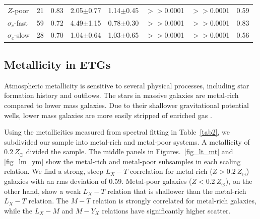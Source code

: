 \documentclass[iop]{emulateapj}
\begin{document}
\begin{table}
\begin{tabular}{llcccccc}
$Z$-poor & 21 & 0.83 & 2.05$\pm$0.77 & 1.14$\pm$0.45 & $>>$0.0001 & $>>$0.0001 & 0.59 \\
$\sigma_c$-fast & 59 & 0.72 & 4.49$\pm$1.15 & 0.78$\pm$0.30 & $>>$0.0001 & $>>$0.0001 & 0.83 \\
$\sigma_c$-slow & 28 & 0.70 & 1.04$\pm$0.64 & 1.03$\pm$0.65 & $>>$0.0001 & $>>$0.0001 & 0.56 \\
\hline
\end{tabular}
\end{table}

\subsection{Metallicity in ETGs}

Atmospheric metallicity is sensitive to several physical processes, including star formation history and outflows. The stars in massive galaxies are metal-rich compared to lower mass galaxies. Due to their shallower gravitational potential wells, lower mass galaxies are more easily stripped of enriched gas \citep{Faber:73, Babyk:13}. 

Using the metallicities measured from spectral fitting in Table~\ref{tab2}, we subdivided our sample into metal-rich and metal-poor systems. A metallicity of $0.2~Z_{\odot}$ divided the sample. The middle panels in Figures.~\ref{fig_lt_mt} and \ref{fig_lm_ym} show the metal-rich and metal-poor subsamples in each scaling relation. We find a strong, steep $L_X-T$ correlation for metal-rich ($Z > 0.2~Z_{\odot}$) galaxies with an rms deviation of 0.59. Metal-poor galaxies ($Z < 0.2~Z_{\odot}$), on the other hand, show a weak $L_X-T$ relation that is shallower than the metal-rich $L_X-T$ relation. The $M-T$ relation is strongly correlated for metal-rich galaxies, while the $L_X-M$ and $M-Y_X$ relations have significantly higher scatter.
\end{document}
